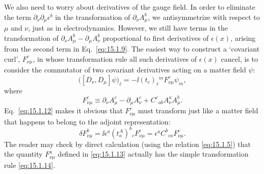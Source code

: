 We also need to worry about derivatives of the gauge field. In order to eliminate
the term $\partial_\nu\partial_\mu\epsilon^b$ in the transformation of
$\partial_\nu A^b_\mu$, we antisymmetrize with respect to $\mu$ and $\nu$,
just as in electrodynamics. However, we still have terms in the transformation of
$\partial_\nu A^b_\mu-\partial_\mu A^b_\nu$ proportional to first
derivatives of $\epsilon(x)$, arising from the second term in
Eq.~\eqref{eq:15.1.9}. The easiest way to construct a `covariant curl',
$F^c_{\nu\mu}$, in whose transformation rule all such derivatives of
$\epsilon(x)$ cancel, is to consider the commutator of two covariant derivatives
acting on a matter field $\psi$:
\begin{equation}
 \bigl([D_\nu,D_\mu]\psi\bigr)_\ell
 =-\ii(t_c)_\ell{}^m F^c_{\nu\mu}\psi_m ,
 \tag{15.1.12}\label{eq:15.1.12}
\end{equation}
where
\begin{equation}
 F^c_{\nu\mu}\equiv\partial_\nu A^c_\mu
 -\partial_\mu A^c_\nu
 +C^c{}_{ab}A^a_\nu A^b_\mu .
 \tag{15.1.13}\label{eq:15.1.13}
\end{equation}
Eq.~\eqref{eq:15.1.12} makes it obvious that $F^c_{\nu\mu}$ must
transform just like a matter field that happens to belong to the adjoint
representation:
\begin{equation}
 \delta F^b_{\nu\mu}
 =\ii\epsilon^a(t^A_a)^b{}_c F^c_{\nu\mu}
 =\epsilon^a C^b{}_{ca}F^c_{\nu\mu} .
 \tag{15.1.14}\label{eq:15.1.14}
\end{equation}
The reader may check by direct calculation (using the relation
\eqref{eq:15.1.5}) that the quantity $F^a_{\nu\mu}$ defined in
\eqref{eq:15.1.13} actually has the simple transformation rule
\eqref{eq:15.1.14}.

